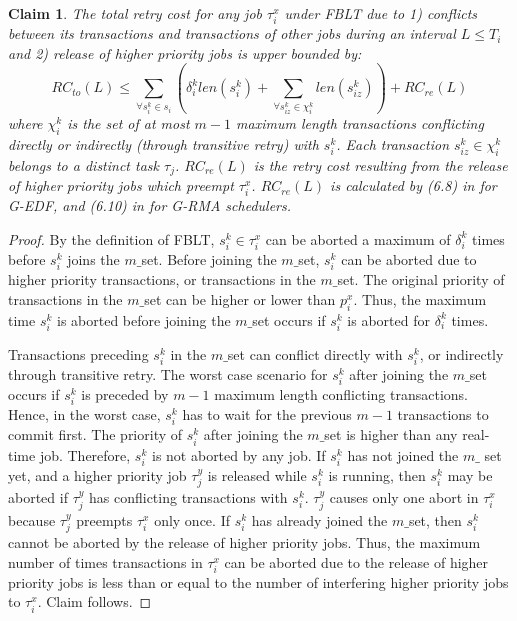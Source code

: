 \documentclass[prodmode,acmtecs]{acmsmall}
\newtheorem{clm}{Claim}
\begin{document}
\begin{compactenum}
\begin{clm}
The total retry cost for any job $\tau_{i}^{x}$ under FBLT due to 1) conflicts
between its transactions and transactions of other jobs during an interval $L\le T_{i}$ and 2) release of higher priority jobs is upper bounded by:
%
\begin{equation}
RC_{to}(L)\le\sum_{\forall s_{i}^{k}\in s_{i}}\left(\delta_{i}^{k}len(s_{i}^{k})+\sum_{\forall s_{iz}^k\in \chi_i^k} len(s_{iz}^{k})\right)+RC_{re}(L)\label{eq:fblt_rc}
\end{equation} 
where $\chi_i^k$ is the set of at most $m-1$ maximum length transactions conflicting directly or indirectly (through transitive retry) with $s_i^k$. Each transaction $s_{iz}^k \in \chi_i^k$ belongs to a distinct task $\tau_j$. $RC_{re}(L)$ is the retry cost resulting
from the release of higher priority jobs which preempt $\tau_{i}^{x}$.
$RC_{re}(L)$ is calculated by (6.8) in \cite{shambake_phd_proposal}
for G-EDF, and (6.10) in \cite{shambake_phd_proposal} for G-RMA schedulers.
%
\end{clm}


\begin{proof}
By the definition of FBLT, $s_{i}^{k}\in\tau_{i}^{x}$ can be aborted
a maximum of $\delta_{i}^{k}$ times before $s_{i}^{k}$ joins the $m\_$set. Before joining the $m\_$set, $s_{i}^{k}$ can be aborted due to higher priority transactions, or transactions
in the $m\_$set. The original priority of transactions in the $m\_$set can be higher or lower than
$p_{i}^{x}$. Thus, the maximum time $s_{i}^{k}$ is aborted before
joining the $m\_$set occurs if $s_{i}^{k}$ is aborted for $\delta_{i}^{k}$ times. 

Transactions preceding  $s_i^k$ in the $m\_$set can conflict directly with $s_i^k$, or indirectly through transitive retry. The worst case scenario for $s_{i}^{k}$ after joining the $m\_$set occurs if $s_{i}^{k}$ is preceded by $m-1$ maximum length conflicting transactions. Hence, in the worst case, $s_{i}^{k}$ has to wait for the previous $m-1$ transactions to commit first. The priority of $s_{i}^{k}$ after joining the $m\_$set is higher than any real-time job. Therefore, $s_{i}^{k}$ is not aborted
by any job. If $s_{i}^{k}$ has not joined the $m\_$ set yet, and a higher
priority job $\tau_{j}^{y}$ is released while $s_{i}^{k}$ is running,
then $s_{i}^{k}$ may be aborted if $\tau_{j}^{y}$ has conflicting
transactions with $s_{i}^{k}$. $\tau_{j}^{y}$ causes only one abort
in $\tau_{i}^{x}$ because $\tau_{j}^{y}$ preempts $\tau_{i}^{x}$
only once. If $s_{i}^{k}$ has already joined the $m\_$set, then $s_{i}^{k}$
cannot be aborted by the release of higher priority jobs. Thus, the maximum
number of times transactions in $\tau_{i}^{x}$ can be aborted due to the release
of higher priority jobs is less than or equal to the number of interfering
higher priority jobs to $\tau_{i}^{x}$. Claim follows.
\end{proof}


\end{compactenum}
\end{document}
